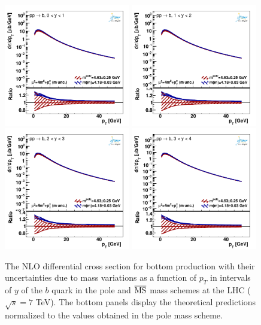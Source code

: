 \documentclass[12pt,a4paper]{article}
\newcommand{\msbar}{\ensuremath{\overline{\rm MS}}\xspace}
\begin{document}
\begin{figure}
    \centering
    \includegraphics[width=0.49\textwidth]{figs/parton-b/dyn-therr-mass/data_401-1.pdf}
    \includegraphics[width=0.49\textwidth]{figs/parton-b/dyn-therr-mass/data_401-2.pdf}
    \includegraphics[width=0.49\textwidth]{figs/parton-b/dyn-therr-mass/data_401-3.pdf}
    \includegraphics[width=0.49\textwidth]{figs/parton-b/dyn-therr-mass/data_401-4.pdf}
    \caption{The NLO differential cross section for bottom production with their uncertainties due to mass variations as a function of $p_T$ in intervals of $y$ of the $b$ quark in the pole and \msbar mass schemes at the LHC ($\sqrt{s} = 7$ TeV). The bottom panels display the theoretical predictions normalized to the values obtained in the pole mass scheme.}
    \label{fig:b-pty-mass}
\end{figure}
\end{document}

